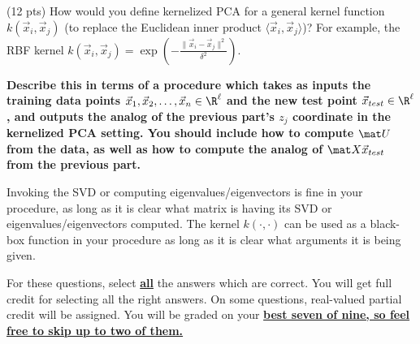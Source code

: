 \documentclass[preview]{standalone}
\begin{document}
\begin{Parts}
\newpage

\Part (12 pts) How would you define kernelized PCA for a general kernel function $k(\vec x_i, \vec x_j)$ (to replace
the Euclidean inner product $\langle \vec x_i, \vec x_j\rangle$)? For example,
the RBF kernel $k(\vec x_i, \vec x_j) = \exp(-\frac{\|\vec x_i  - \vec
  x_j\|^2}{\delta^2})$.

{\bf Describe this in terms of a procedure which takes as inputs the
  training data points $\vec x_1, \vec x_2, \ldots, \vec x_n \in \R^\ell$ and the new test
point $\vec x_{test}\in \R^\ell$, and outputs the analog of the
previous part's $z_j$ coordinate in the kernelized PCA setting. You should
include how to compute $\mat U$ from the data, as well as how to
compute the analog of $\mat X \vec x_{test}$ from the previous part.
}

Invoking the SVD or computing eigenvalues/eigenvectors is fine in your procedure, as long as it is clear
what matrix is having its SVD or eigenvalues/eigenvectors
computed. The kernel $k(\cdot, \cdot)$ can be used as a black-box
function in your procedure as long as it is clear what arguments it is
being given.



\end{Parts}


For these questions, select \underline{\bf all} the answers which are correct.
You will get full credit for selecting all the right answers.
On some questions, real-valued partial credit will be assigned. You
will be graded on your \underline{\bf best seven of nine, so feel free to skip up to two of them.}
\end{document}
